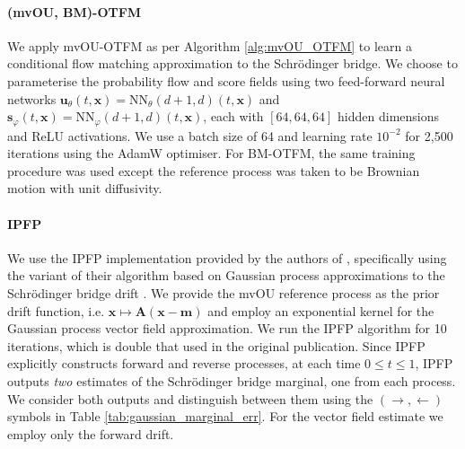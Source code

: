 \documentclass{article}
\theoremstyle{newstyle}
\begin{document}
\paragraph{(mvOU, BM)-OTFM} We apply mvOU-OTFM as per Algorithm \ref{alg:mvOU_OTFM} to learn a conditional flow matching approximation to the Schr\"odinger bridge. We choose to parameterise the probability flow and score fields using two feed-forward neural networks $\bm{u}_\theta(t, \bm{x}) = \mathrm{NN}_\theta(d+1, d)(t, \bm{x})$ and $\bm{s}_\varphi(t, \bm{x}) = \mathrm{NN}_\varphi(d+1, d)(t, \bm{x})$, each with $[64, 64, 64]$ hidden dimensions and ReLU activations. We use a batch size of 64 and learning rate $10^{-2}$ for 2,500 iterations using the AdamW optimiser.
For BM-OTFM, the same training procedure was used except the reference process was taken to be Brownian motion with unit diffusivity. 
\paragraph{IPFP} We use the IPFP implementation provided by the authors of \cite{vargas2021solving}, specifically using the variant of their algorithm based on Gaussian process approximations to the Schr\"odinger bridge drift \cite[Algorithm 2]{vargas2021solving}. We provide the mvOU reference process as the prior drift function, i.e. $\bm{x} \mapsto \bm{A}(\bm{x} - \bm{m})$ and employ an exponential kernel for the Gaussian process vector field approximation. We run the IPFP algorithm for 10 iterations, which is double that used in the original publication. Since IPFP explicitly constructs forward and reverse processes, at each time $0 \leq t \leq 1$, IPFP outputs \emph{two} estimates of the Schr\"odinger bridge marginal, one from each process. We consider both outputs and distinguish between them using the $(\rightarrow, \leftarrow)$ symbols in Table \ref{tab:gaussian_marginal_err}. For the vector field estimate we employ only the forward drift.
\end{document}
